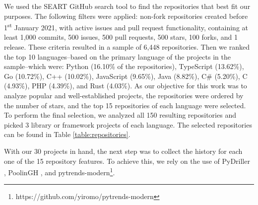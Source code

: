 \documentclass[10pt,conference,peerreview]{IEEEtran}
\begin{document}
We used the SEART GitHub search tool \cite{seart} to find the repositories that best fit our purposes. The following filters were applied: non-fork repositories created before 1\textsuperscript{st} January 2021, with active issues and pull request functionality, containing at least 1,000 commits, 500 issues, 500 pull requests, 500 stars, 100 forks, and 1 release. These criteria resulted in a sample of 6,448 repositories. Then we ranked the top 10 languages--based on the primary language of the projects in the sample--which were: Python (16.10\% of the repositories), TypeScript (13.62\%), Go (10.72\%), C++ (10.02\%), JavaScript (9.65\%), Java (8.82\%), C\# (5.20\%), C (4.93\%), PHP (4.39\%), and Rust (4.03\%). As our objective for this work was to analyze popular and well-established projects, the repositories were ordered by the number of stars, and the top 15 repositories of each language were selected. To perform the final selection, we analyzed all 150 resulting repositories and picked 3 library or framework projects of each language. The selected repositories can be found in Table \ref{table:repositories}.

With our 30 projects in hand, the next step was to collect the history for each one of the 15 repository features. To achieve this, we rely on the use of PyDriller \cite{pydriller}, PoolinGH \cite{poolingh}, and pytrends-modern\footnote{https://github.com/yiromo/pytrends-modern}.

\begin{table}[ht]
    \caption{GitHub Repositories Collected by Language and Sorted by Number of Stars}
    \label{table:repositories}
    \centering
\end{table}
\end{document}
